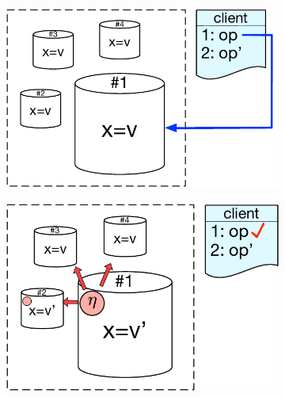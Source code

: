 \begin{figure}[b]
    \centering
    \begin{subfigure}[t]{0.3\textwidth}
    \centering
        \includegraphics[scale=0.32]{Figures/system_model1.pdf}
        \label{fig:sys_model1}
    \end{subfigure}
    \hfill
    \vline
    \hfill
    \begin{subfigure}[t]{0.3\textwidth}
        \centering
	\includegraphics[scale=0.32]{Figures/system_model2.pdf}
        \label{fig:sys_model2}
    \end{subfigure}
    \hfill
    \vline
    \hfill
    \begin{subfigure}[t]{0.3\textwidth}

\end{subfigure}
\end{figure}

